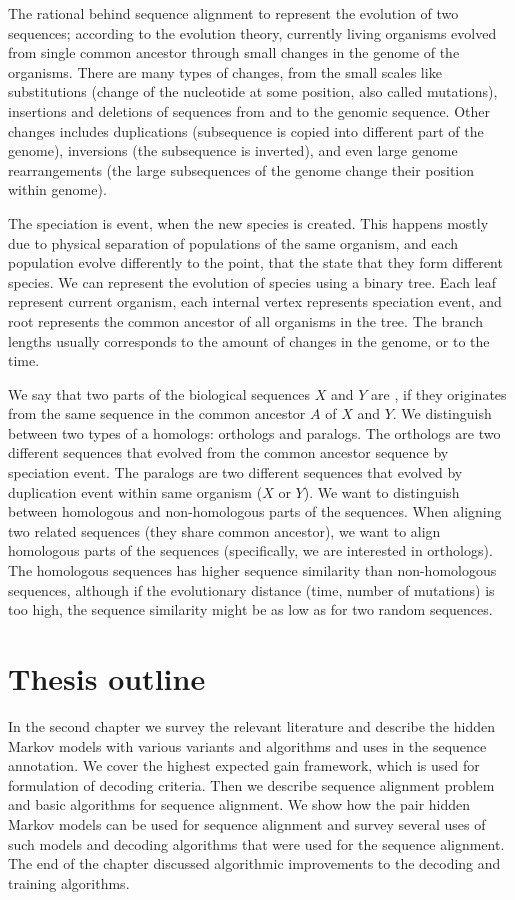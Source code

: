 The rational behind sequence alignment to represent the evolution of two
sequences; according to the evolution theory, currently living organisms
evolved from single common ancestor through small changes in the genome of the
organisms. There are many types of changes, from the small scales like
substitutions (change of the nucleotide at some position, also called
mutations), insertions and deletions of sequences from and to the genomic
sequence. Other changes includes duplications (subsequence is copied into
different part of the genome), inversions (the subsequence is inverted), and
even large genome rearrangements (the large subsequences of the genome change
their position within genome). 

The speciation is event, when the new species is created. This happens mostly
due to physical separation of populations of the same organism, and each
population evolve differently to the point, that the state that they form
different species. We can represent the evolution of species using a binary
tree. Each leaf represent current organism, each internal vertex represents
speciation event, and root represents the common ancestor of all organisms in
the tree. The branch lengths usually corresponds to the amount of changes in
the genome, or to the time. 

We say that two parts of the biological sequences $X$ and $Y$ are
, if they originates from the same sequence in the
common ancestor $A$ of $X$ and $Y$. We distinguish between two types of a
homologs: orthologs and paralogs. The orthologs are two different sequences
that evolved from the common ancestor sequence by speciation event. The
paralogs are two different sequences that evolved by duplication event within
same organism ($X$ or $Y$). We want to distinguish between homologous and
non-homologous parts of the sequences. When aligning two related sequences
(they share common ancestor), we want to align homologous parts of the
sequences (specifically, we are interested in orthologs). The homologous
sequences has higher sequence similarity than non-homologous sequences,
although if the evolutionary distance (time, number of mutations) is too high,
the sequence similarity might be as low as for two random sequences.


\section{Thesis outline}

In the second chapter we survey the relevant literature and describe the hidden
Markov models with various variants and algorithms and uses in the sequence
annotation. We cover the highest expected gain framework, which is used for
formulation of decoding criteria. Then we describe sequence alignment problem
and basic algorithms for sequence alignment. We show how the pair hidden Markov
models can be used for sequence alignment and survey several uses of such
models and decoding algorithms that were used for the sequence alignment.  The
end of the chapter discussed algorithmic improvements to the decoding and
training algorithms.

